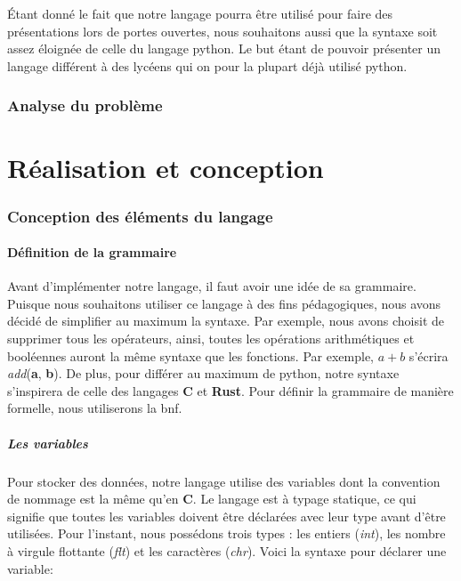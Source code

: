 \documentclass[a4paper]{article}%
\begin{document}
Étant donné le fait que notre langage pourra être utilisé pour faire des
présentations lors de portes ouvertes, nous souhaitons aussi que la syntaxe soit
assez éloignée de celle du langage python. Le but étant de pouvoir présenter
un langage différent à des lycéens qui on pour la plupart déjà utilisé python.

\section{Analyse du problème}


\part{Réalisation et conception}

\section{Conception des éléments du langage}

\subsection{Définition de la grammaire}

Avant d'implémenter notre langage, il faut avoir une idée de sa grammaire.
Puisque nous souhaitons utiliser ce langage à des fins pédagogiques, nous avons
décidé de simplifier au maximum la syntaxe. Par exemple, nous avons choisit de
supprimer tous les opérateurs, ainsi, toutes les opérations arithmétiques et
booléennes auront la même syntaxe que les fonctions. Par exemple, $a+b$ s'écrira
\textit{add}(\textbf{a}, \textbf{b}). De plus, pour différer au maximum de
python, notre syntaxe s'inspirera de celle des langages \textbf{C} et
\textbf{Rust}. Pour définir la grammaire de manière formelle, nous utiliserons
la \gls{bnf}.

\subsubsection*{Les variables}

Pour stocker des données, notre langage utilise des variables dont la
convention de nommage est la même qu'en \textbf{C}. Le langage est à typage
statique, ce qui signifie que toutes les variables doivent être déclarées avec
leur type avant d'être utilisées. Pour l'instant, nous possédons trois types :
les entiers (\textit{int}), les nombre à virgule flottante (\textit{flt}) et les
caractères (\textit{chr}). Voici la syntaxe pour déclarer une variable:
\end{document}
